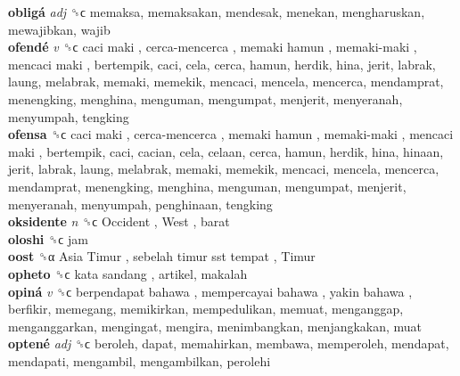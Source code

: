 \textbf{obligá} \emph{adj}  ␝ϲ  memaksa, memaksakan, mendesak, menekan, mengharuskan, mewajibkan, wajib  \\
\textbf{ofendé} \emph{v}  ␝ϲ   caci maki ,  cerca-mencerca ,  memaki hamun ,  memaki-maki ,  mencaci maki , bertempik, caci, cela, cerca, hamun, herdik, hina, jerit, labrak, laung, melabrak, memaki, memekik, mencaci, mencela, mencerca, mendamprat, menengking, menghina, menguman, mengumpat, menjerit, menyeranah, menyumpah, tengking  \\
\textbf{ofensa} ␝ϲ   caci maki ,  cerca-mencerca ,  memaki hamun ,  memaki-maki ,  mencaci maki , bertempik, caci, cacian, cela, celaan, cerca, hamun, herdik, hina, hinaan, jerit, labrak, laung, melabrak, memaki, memekik, mencaci, mencela, mencerca, mendamprat, menengking, menghina, menguman, mengumpat, menjerit, menyeranah, menyumpah, penghinaan, tengking  \\
\textbf{oksidente} \emph{n}  ␝ϲ   Occident ,  West , barat  \\
\textbf{oloshi} ␝ϲ  jam  \\
\textbf{oost} ␝α   Asia Timur ,  sebelah timur sst tempat ,  Timur   \\
\textbf{opheto} ␝ϲ   kata sandang , artikel, makalah  \\
\textbf{opiná} \emph{v}  ␝ϲ   berpendapat bahawa ,  mempercayai bahawa ,  yakin bahawa , berfikir, memegang, memikirkan, mempedulikan, memuat, menganggap, menganggarkan, mengingat, mengira, menimbangkan, menjangkakan, muat  \\
\textbf{optené} \emph{adj}  ␝ϲ  beroleh, dapat, memahirkan, membawa, memperoleh, mendapat, mendapati, mengambil, mengambilkan, perolehi  \\
